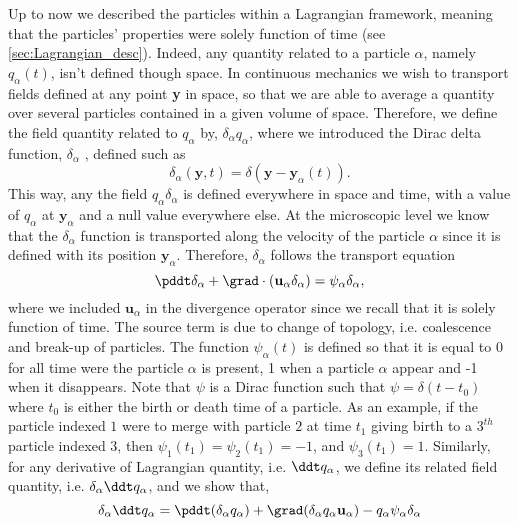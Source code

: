Up to now we described the particles within a Lagrangian framework, meaning that the particles' properties were solely function of time (see \ref{sec:Lagrangian_desc}). 
Indeed, any quantity related to a particle $\alpha$, namely $q_\alpha(t)$, isn't defined though space. 
In continuous mechanics we wish to transport fields defined at any point \textbf{y} in space, so that we are able to average a quantity over several particles contained in a given volume of space.
Therefore, we define the field quantity related  to $q_\alpha$ by, $\delta_\alpha q_\alpha$, where we introduced the Dirac delta function, $\delta_\alpha$ \citep{morel2015mathematical}, defined such as
\begin{equation}
    \delta_\alpha(\textbf{y},t) = \delta(\textbf{y}-\textbf{y}_\alpha(t)).
\end{equation}
This way, any the field $q_\alpha \delta_\alpha$ is defined everywhere in space and time, with a value of $q_\alpha$ at $\textbf{y}_\alpha$ and a null value everywhere else. 
At the microscopic level we know that the $\delta_\alpha$ function is transported along the velocity of the particle $\alpha$ since it is defined with its position $\textbf{y}_\alpha$. 
Therefore, $\delta_\alpha$ follows the transport equation 
\begin{equation}
    \pddt \delta_\alpha 
    + \grad \cdot (\textbf{u}_\alpha  \delta_\alpha) 
    = \psi_\alpha \delta_\alpha,
    \label{eq:delta_alpha_dt}
\end{equation}
where we included $\textbf{u}_\alpha$ in the divergence operator since we recall that it is solely function of time. 
The source term is due to change of topology, i.e. coalescence and break-up of particles.
The function $\psi_\alpha(t)$ is defined so that it is equal to 0 for all time were the particle $\alpha$ is present, 1 when a particle $\alpha$ appear and -1 when it disappears.
Note that $\psi$ is a Dirac function such that $\psi = \delta(t - t_0)$ where $t_0$ is either the birth or death time of a particle. 
As an example, if the particle indexed $1$ were to merge with particle $2$ at time $t_1$ giving birth to a $3^{th}$ particle indexed $3$, then $\psi_1(t_1) = \psi_2(t_1) = -1$, and $\psi_3(t_1) = 1$. 
Similarly, for any derivative of Lagrangian quantity, i.e. $\ddt q_\alpha$, we define its related field quantity, i.e. $\delta_\alpha \ddt q_\alpha$, and we show that, 
\begin{equation}
    \delta_\alpha \ddt q_\alpha
    = \pddt (\delta_\alpha q_\alpha)
    + \grad (\delta_\alpha q_\alpha \textbf{u}_\alpha)
    - q_\alpha \psi_\alpha \delta_\alpha
    \label{eq:delta_q_alpha_dt}
\end{equation}
